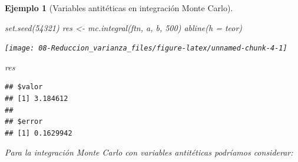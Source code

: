 \documentclass[
]{book}
\newenvironment{Shaded}{\begin{snugshade}}{\end{snugshade}}
\newcommand{\AttributeTok}[1]{\textcolor[rgb]{0.77,0.63,0.00}{#1}}
\newcommand{\DecValTok}[1]{\textcolor[rgb]{0.00,0.00,0.81}{#1}}
\newcommand{\FunctionTok}[1]{\textcolor[rgb]{0.00,0.00,0.00}{#1}}
\newcommand{\NormalTok}[1]{#1}
\newcommand{\OtherTok}[1]{\textcolor[rgb]{0.56,0.35,0.01}{#1}}
\theoremstyle{break}
\newtheorem{example}{Ejemplo}[chapter]
\theoremstyle{nonumberplain}
\begin{document}
\begin{example}[Variables antitéticas en integración Monte Carlo]
\begin{Shaded}
\begin{Highlighting}[]
\FunctionTok{set.seed}\NormalTok{(}\DecValTok{54321}\NormalTok{)}
\NormalTok{res }\OtherTok{\textless{}{-}} \FunctionTok{mc.integral}\NormalTok{(ftn, a, b, }\DecValTok{500}\NormalTok{)}
\FunctionTok{abline}\NormalTok{(}\AttributeTok{h =}\NormalTok{ teor)}
\end{Highlighting}
\end{Shaded}

\begin{center}\texttt{[image: 08-Reduccion\_varianza\_files/figure-latex/unnamed-chunk-4-1]} \end{center}

\begin{Shaded}
\begin{Highlighting}[]
\NormalTok{res}
\end{Highlighting}
\end{Shaded}

\begin{verbatim}
## $valor
## [1] 3.184612
## 
## $error
## [1] 0.1629942
\end{verbatim}

Para la integración Monte Carlo con variables antitéticas podríamos considerar:


\end{example}
\end{document}
